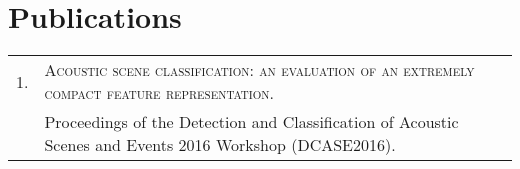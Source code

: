 \section{Publications}
\vspace{0.0cm}

\begin{tabular}{p{0.2cm} p{16cm}}
    1. & \textsc{Acoustic scene classification: an evaluation of an extremely compact feature representation.}
    \\
    & Proceedings of the Detection and Classification of Acoustic Scenes and Events 2016 Workshop (DCASE2016).
\end{tabular}
